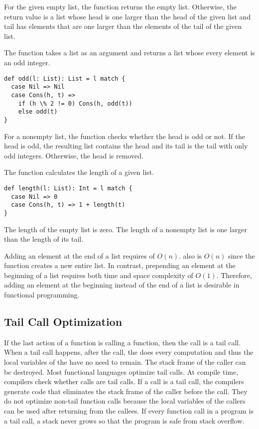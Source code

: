 For the given empty list, the function returns the empty list. Otherwise, the
return value is a list whose head is one larger than the head of the given list
and tail has elements that are one larger than the elements of the tail of the
given list.

The  function takes a list as an argument and returns a list whose
every element is an odd integer.

\begin{verbatim}
def odd(l: List): List = l match {
  case Nil => Nil
  case Cons(h, t) =>
    if (h \% 2 != 0) Cons(h, odd(t))
    else odd(t)
}
\end{verbatim}

For a nonempty list, the function checks whether the head is odd or not. If the
head is odd, the resulting list contains the head and its tail is the tail with
only odd integers. Otherwise, the head is removed.

The  function calculates the length of a given list.

\begin{verbatim}
def length(l: List): Int = l match {
  case Nil => 0
  case Cons(h, t) => 1 + length(t)
}
\end{verbatim}

The length of the empty list is zero. The length of a nonempty list is one larger
than the length of its tail.

Adding an element at the end of a list requires  of
\(O(n)\).  also is \(O(n)\) since the function creates a
new entire list. In contrast, prepending an element at the beginning of a list
requires both time and space complexity of \(O(1)\). Therefore, adding an element
at the beginning instead of the end of a list is desirable in functional
programming.

\subsection{Tail Call Optimization}

If the last action of a function is calling a function, then the call is a tail
call. When a tail call happens, after the call, the  does every
computation and thus the local variables of the  have no need to
remain. The stack frame of the caller can be destroyed. Most functional languages
optimize tail calls. At compile time, compilers check whether calls are tail
calls. If a call is a tail call, the compilers generate code that eliminates the
stack frame of the caller before the call. They do not optimize non-tail function
calls because the local variables of the callers can be used after returning from
the callees. If every function call in a program is a tail call, a stack never
grows so that the program is safe from stack overflow.

